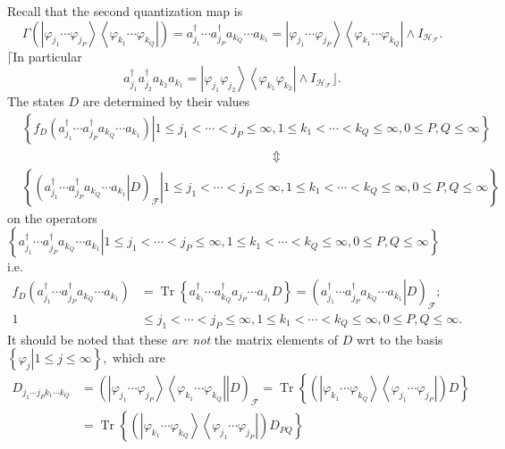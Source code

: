 \documentclass[aps,preprint]{revtex4}%
\begin{document}
Recall that the second quantization map is
\begin{equation}
\Gamma\left(  \left\vert \varphi_{j_{1}}\cdots\varphi_{j_{P}}\right\rangle
\left\langle \varphi_{k_{1}}\cdots\varphi_{k_{Q}}\right\vert \right)
=a_{j_{1}}^{\dagger}\cdots a_{j_{P}}^{\dagger}a_{k_{Q}}\cdots a_{k_{1}%
}=\left\vert \varphi_{j_{1}}\cdots\varphi_{j_{P}}\right\rangle \left\langle
\varphi_{k_{1}}\cdots\varphi_{k_{Q}}\right\vert \wedge I_{\mathcal{H}%
_{\mathcal{F}}}.
\end{equation}
$\lceil$In particular%
\[
a_{j_{1}}^{\dagger}a_{j_{2}}^{\dagger}a_{k_{2}}a_{k_{1}}=\left\vert
\varphi_{j_{1}}\varphi_{j_{2}}\right\rangle \left\langle \varphi_{k_{1}%
}\varphi_{k_{2}}\right\vert \wedge I_{\mathcal{H}_{\mathcal{F}}}\rfloor.
\]
The states $D$ are determined by their values
\begin{align}
&  \left\{  \left.  f_{D}\left(  a_{j_{1}}^{\dagger}\cdots a_{j_{P}}^{\dagger
}a_{k_{Q}}\cdots a_{k_{1}}\right)  \right\vert 1\leq j_{1}<\cdots<j_{P}%
\leq\infty,1\leq k_{1}<\cdots<k_{Q}\leq\infty,0\leq P,Q\leq\infty\right\}
\nonumber\\
&  \qquad\qquad\qquad\qquad\qquad\qquad\qquad\qquad\qquad\qquad\left.
\Updownarrow\right. \nonumber\\
&  \left\{  \left.  \left(  \left.  a_{j_{1}}^{\dagger}\cdots a_{j_{P}%
}^{\dagger}a_{k_{Q}}\cdots a_{k_{1}}\right\vert D\right)  _{\mathcal{F}%
}\right\vert 1\leq j_{1}<\cdots<j_{P}\leq\infty,1\leq k_{1}<\cdots<k_{Q}%
\leq\infty,0\leq P,Q\leq\infty\right\}
\end{align}
on the operators $\left\{  \left.  a_{j_{1}}^{\dagger}\cdots a_{j_{P}%
}^{\dagger}a_{k_{Q}}\cdots a_{k_{1}}\right\vert 1\leq j_{1}<\cdots<j_{P}%
\leq\infty,1\leq k_{1}<\cdots<k_{Q}\leq\infty,0\leq P,Q\leq\infty\right\}  $
i.e.
\begin{align}
f_{D}\left(  a_{j_{1}}^{\dagger}\cdots a_{j_{P}}^{\dagger}a_{k_{Q}}\cdots
a_{k_{1}}\right)   &  =\operatorname{Tr}\left\{  a_{k_{1}}^{\dagger}\cdots
a_{k_{Q}}^{\dagger}a_{j_{P}}\cdots a_{j_{1}}D\right\}  =\left(  \left.
a_{j_{1}}^{\dagger}\cdots a_{j_{P}}^{\dagger}a_{k_{Q}}\cdots a_{k_{1}%
}\right\vert D\right)  _{\mathcal{F}};\nonumber\\
1  &  \leq j_{1}<\cdots<j_{P}\leq\infty,1\leq k_{1}<\cdots<k_{Q}\leq
\infty,0\leq P,Q\leq\infty.
\end{align}
It should be noted that these \emph{are not} the matrix elements of $D$ wrt to
the basis $\left\{  \left.  \varphi_{j}\right\vert 1\leq j\leq\infty\right\}
,$ which are
\begin{align}
D_{j_{1}\cdots j_{P}k_{1}\cdots k_{Q}}  &  =\left(  \left.  \left\vert
\varphi_{j_{1}}\cdots\varphi_{j_{P}}\right\rangle \left\langle \varphi_{k_{1}%
}\cdots\varphi_{k_{Q}}\right\vert \right\vert D\right)  _{\mathcal{F}%
}=\operatorname{Tr}\left\{  \left(  \left\vert \varphi_{k_{1}}\cdots
\varphi_{k_{Q}}\right\rangle \left\langle \varphi_{j_{1}}\cdots\varphi_{j_{P}%
}\right\vert \right)  D\right\} \nonumber\\
&  =\operatorname{Tr}\left\{  \left(  \left\vert \varphi_{k_{1}}\cdots
\varphi_{k_{Q}}\right\rangle \left\langle \varphi_{j_{1}}\cdots\varphi_{j_{P}%
}\right\vert \right)  D_{PQ}\right\}
\end{align}
\end{document}
